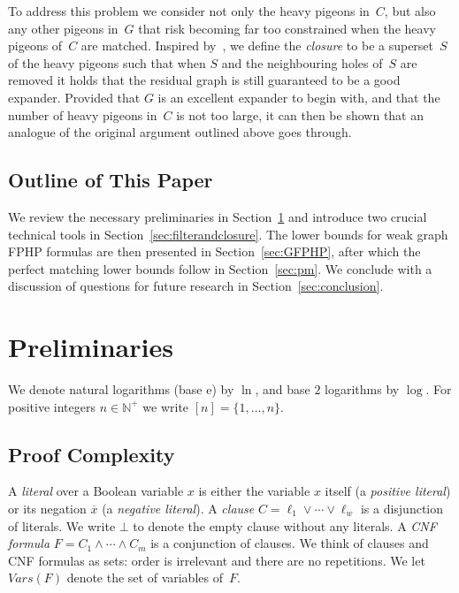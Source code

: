 \documentclass{theoretics}
\newcommand{\formuladots}{\cdots}
\newcommand{\Nplus}     {\mathbb{N}^{+}}
\newcommand{\set}[1]{\{ #1 \}}
\newcommand{\olnot}[1]{\overline{#1}}
\newcommand{\introduceterm}[1]{{\emph{#1}}}
\newcommand{\refsec}[1]{Section~\ref{#1}}
\newcommand{\emptycl}{\bot}
\newcommand{\formf}{\ensuremath{F}}
\newcommand{\varx}{\ensuremath{x}}
\newcommand{\clc}{\ensuremath{C}}
\newcommand{\setsofvarsorlit}[2]{\mathit{#1}({#2})}
\newcommand{\vars}[1]{\setsofvarsorlit{Vars}{#1}}
\newcommand{\heavy}{heavy\xspace}
\newcommand{\squeezesubsection}[1]{\subsection{#1}}
\numberwithin{equation}{section}
\begin{document}
To address this problem we consider not only the \heavy pigeons
in~$\clc$, but also any other pigeons in~$G$ that risk becoming far too
constrained when the 
\heavy pigeons of~$\clc$ 
are matched.
Inspired by~\cite{ABRW04Pseudorandom,AR03LowerBounds},
we define the \introduceterm{closure} to be a
superset~$S$ of the \heavy pigeons such that when $S$ and the
neighbouring holes of~$S$ are removed it holds that the residual graph is
still guaranteed to be a good expander. Provided that $G$ is an
excellent expander to begin with, and that the number of
\heavy pigeons in~$\clc$ is not too large, it can then be shown that an
analogue of the original argument outlined above goes through.


\squeezesubsection{Outline of This Paper}

We review the necessary preliminaries in 
\refsec{sec:prelims}
and introduce two crucial technical tools in
\refsec{sec:filterandclosure}.
The lower bounds for weak graph FPHP formulas are then presented in
\refsec{sec:GFPHP},
after which the perfect matching lower bounds follow in
\refsec{sec:pm}.
We conclude with a discussion of questions for future research in
\refsec{sec:conclusion}.



 
\section{Preliminaries}
\label{sec:prelims}

We denote natural logarithms (base $\mathrm{e}$) by $\ln$, and base
$2$ logarithms by $\log$.  For positive integers $n \in \Nplus$ we
write $[n] = \set{1,\ldots,n}$.

\subsection{Proof Complexity}

A \introduceterm{literal} over a Boolean variable $\varx$ is either
the variable $\varx$ itself (a \introduceterm{positive literal}) or
its negation $\olnot{\varx}$ (a
\introduceterm{negative literal}).
A \introduceterm{clause}
$\clc = \ell_1 \lor \formuladots \lor \ell_{w}$ is a disjunction
of literals.
We write $\emptycl$ to denote the empty clause without any literals.
A \introduceterm{CNF formula}
$\formf = \clc_1 \land \formuladots \land \clc_m$ is a conjunction
of clauses.
We think of clauses and CNF formulas as sets:
order is irrelevant and there are no repetitions.
We let $\vars{\formf}$ denote the set of variables of~$\formf$.
\end{document}
